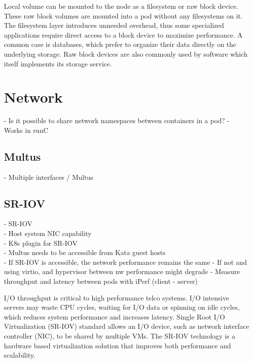 Local volume can be mounted to the node as a filesystem or raw block device. These raw block volumes are mounted into a pod without any filesystems on it. The filesystem layer introduces unneeded overhead, thus some specialized applications require direct access to a block device to maximize performance. A common case is databases, which prefer to organize their data directly on the underlying storage. Raw block devices are also commonly used by software which itself implements its storage service. \cite{RawBlockKubernetes}


\section{Network}

- Is it possible to share network namespaces between containers in a pod?
	- Works in runC

\subsection{Multus}

- Multiple interfaces / Multus \\

\subsection{SR-IOV}
\label{section:SR-IOV}

- SR-IOV \\
	- Host system NIC capability \\
	- K8s plugin for SR-IOV \\
	- Multus needs to be accessible from Kata guest hosts \\
	
- If SR-IOV is accessible, the network performance remains the same
	- If not and using virtio, and hypervisor between nw performance might degrade
		- Measure throughput and latency between pods with iPerf (client - server)
	
I/O throughput is critical to high performance telco systems. I/O intensive servers may waste CPU cycles, waiting for I/O data or spinning on idle cycles, which reduces system performance and increases latency. Single Root I/O Virtualization (SR-IOV) standard allows an I/O device, such as network interface controller (NIC), to be shared by multiple VMs. The SR-IOV technology is a hardware based virtualization solution that improves both performance and scalability. \cite{Dong2012}

